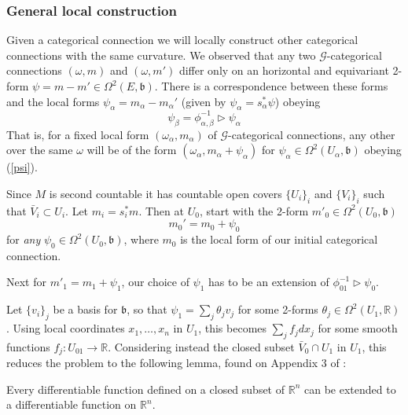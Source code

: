 \subsubsection{General local construction} Given a categorical connection we will locally construct other categorical connections with the same curvature.  We observed that any two $\mathscr{G}$-categorical connections $(\omega,m)$ and $(\omega,m')$ differ only on an horizontal and equivariant 2-form $\psi=m-m'\in\Omega^2(E,\mathfrak{b})$. There is a correspondence between these forms and the local forms $\psi_\alpha=m_\alpha-m_\alpha'$ (given by $\psi_\alpha=s_\alpha^*\psi$) obeying
\begin{equation}\label{psi}
\psi_\beta=\phi_{\alpha,\beta}^{-1}\vartriangleright \psi_\alpha                                                                                                                                                                                                                                                                                                                                                                                                                                                                                                                                                                               \end{equation}
That is, for a fixed local form  $(\omega_\alpha,m_\alpha)$ of $\mathscr{G}$-categorical connections, any other over the same $\omega$ will be of the form $(\omega_\alpha,m_\alpha+\psi_\alpha)$ for $\psi_\alpha\in\Omega^2(U_\alpha,\mathfrak{b})$ obeying (\ref{psi}).

Since $M$ is second countable it has countable open covers $\{U_i\}_i$ and $\{V_i\}_i$ such that $\bar{V}_i\subset U_i$. Let $m_{i}=s_i^*m$. Then at $U_0$, start with the 2-form $m'_0\in\Omega^2(U_0,\mathfrak{b})$ 
\[
 m_0'=m_{0}+\psi_0
\]
for \emph{any} $\psi_0\in\Omega^2(U_0,\mathfrak{b})$, where $m_0$ is the local form of our initial categorical connection. 

Next for $m'_1=m_1+\psi_1$, our choice of $\psi_1$ has to be an extension of $\phi_{01}^{-1}\vartriangleright\psi_0$. 



Let $\{v_i\}_j$ be a basis for $\mathfrak{b}$, so that $\psi_1=\sum_j \theta_j v_j$ for some 2-forms $\theta_j\in\Omega^2(U_1,\mathbb{R})$. Using local coordinates $x_1,\ldots,x_n$ in $U_1$, this becomes $\sum_j f_jdx_j$ for some smooth functions $f_j:U_{01}\rightarrow \mathbb{R}$. Considering instead the closed subset $\bar{V}_0\cap U_1$ in $U_1$, this reduces the problem to the following lemma, found on Appendix 3 of \cite{kobayashi1}:
\begin{lemma}\label{closed}
 Every differentiable function defined on a closed subset of $\mathbb{R}^n$ can be extended to a differentiable function on $\mathbb{R}^n$.
\end{lemma}

